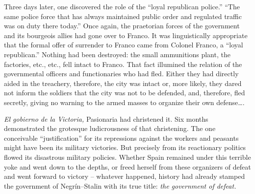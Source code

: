 Three days later, one discovered the role of the ``loyal republican police.\kn\kn'' ``The same police force that has always maintained public order and regulated traffic was on duty there today.\kn\kn'' Once again, the praetorian forces of the government and its bourgeois allies had gone over to Franco. It was linguistically appropriate that the formal offer of surrender to Franco came from Colonel Franco, a ``loyal republican.\kn\kn'' Nothing had been destroyed: the small ammunitions plant, the factories, etc., etc., fell intact to Franco. That fact illumined the relation of the governmental officers and functionaries who had fled. Either they had directly aided in the treachery\kn, therefore, the city was intact or, more likely\kn, they dared not inform the soldiers that the city was not to be defended, and, therefore, fled secretly\kn, giving no warning to the armed masses to organize their own defense\dots.

\emph{El gobierno de la Victoria,} Pasionaria had christened it. Six months demonstrated the grotesque ludicrousness of that christening. The one conceivable ``justification'' for its repressions against the workers and peasants might have been its military victories. But precisely from its reactionary politics flowed its disastrous military policies. Whether Spain remained under this terrible yoke and went down to the depths, or freed herself from these organizers of defeat and went forward to victory – whatever happened, history had already stamped the government of Negr\'in--Stalin with its true title: \emph{the government of defeat.}
